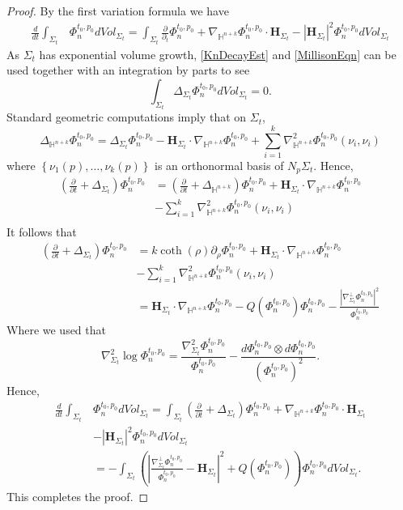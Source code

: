 \documentclass{amsart}
\theoremstyle{definition}
\theoremstyle{remark}
\numberwithin{equation}{section}
\newcommand{\set}[1]{\left\{#1\right\}}
\begin{document}
\begin{proof}
	By the first variation formula we have
	\begin{align*}
	\frac{d}{dt} \int_{\Sigma_t}& \Phi_n^{t_0, p_0} dVol_{\Sigma_t}=\int_{\Sigma_t} \frac{\partial}{\partial_t} \Phi_n^{t_0, p_0}+\nabla_{\mathbb{H}^{n+k}} \Phi_n^{t_0, p_0} \cdot \mathbf{H}_{\Sigma_t} -|\mathbf{H}_{\Sigma_t}|^2 \Phi_n^{t_0, p_0}  dVol_{\Sigma_t}
	\end{align*}
	As  $\Sigma_t$ has exponential volume growth,  \eqref{KnDecayEst} and \eqref{MillisonEqn} can be used together with an integration by parts to see
	$$
	\int_{\Sigma_t} \Delta_{{\Sigma_t}} \Phi_n^{t_0, p_0} dVol_{\Sigma_t}=0.
	$$
	Standard geometric computations imply that on $\Sigma_t$,
	$$
	\Delta_{\mathbb{H}^{n+k}} \Phi_n^{t_0, p_0} =  \Delta_{{\Sigma_t}}\Phi_n^{t_0, p_0} -\mathbf{H}_{\Sigma_t}\cdot \nabla_{\mathbb{H}^{n+k}}  \Phi_n^{t_0, p_0}+\sum_{i=1}^{k}\nabla^2_{\mathbb{H}^{n+k} }\Phi_n^{t_0, p_0} (\nu_i, \nu_i)
	$$
	where $\set{\nu_1(p), \ldots, \nu_{k}(p)}$ is an orthonormal basis of $N_p\Sigma_t$.  
	Hence,
	\begin{align*}
	\left(\frac{\partial}{\partial t} +\Delta_{\Sigma_t}\right)\Phi_n^{t_0, p_0} & =	\left(\frac{\partial}{\partial t} +\Delta_{\mathbb{H}^{n+k}}\right)\Phi_n^{t_0, p_0}+\mathbf{H}_{\Sigma_t}\cdot \nabla_{\mathbb{H}^{n+k}}  \Phi_n^{t_0, p_0}\\
	& -\sum_{i=1}^{k}\nabla^2_{\mathbb{H}^{n+k} }\Phi_n^{t_0, p_0} (\nu_i, \nu_i)\\
	\end{align*}
	It follows that
\begin{align*}
	\left(\frac{\partial}{\partial t} +\Delta_{\Sigma_t}\right)\Phi_n^{t_0, p_0} 	&= 	k \coth(\rho) \partial_\rho \Phi_{n}^{t_0,p_0}+\mathbf{H}_{\Sigma_t}\cdot \nabla_{\mathbb{H}^{n+k}}  \Phi_n^{t_0, p_0}\\
	& -\sum_{i=1}^{k}\nabla^2_{\mathbb{H}^{n+k} }\Phi_n^{t_0, p_0} (\nu_i, \nu_i)\\
	&=\mathbf{H}_{\Sigma_t}\cdot \nabla_{\mathbb{H}^{n+k}}  \Phi_n^{t_0, p_0} -Q(\Phi_n^{t_0,p_0}) \Phi_n^{t_0, p_0}	-\frac{|\nabla_{\Sigma_t}^\perp \Phi_n^{t_0,p_0}|^2}{\Phi_n^{t_0, p_0}}
	\end{align*}
	Where we used that
	$$
	 \nabla_{\Sigma_t}^2 \log \Phi_n^{t_0,p_0}=\frac{\nabla_{\Sigma_t}^2\Phi_n^{t_0,p_0}}{\Phi_n^{t_0,p_0}} -\frac{d\Phi_n^{t_0,p_0} \otimes d\Phi_n^{t_0,p_0}}{(\Phi_n^{t_0,p_0})^2}.
	$$
	Hence,
	\begin{align*}
	 \frac{d}{dt} \int_{\Sigma_t}& \Phi_n^{t_0, p_0} dVol_{\Sigma_t}=\int_{\Sigma_t}  \left(\frac{\partial}{\partial t} +\Delta_{\Sigma_t} \right)\Phi_n^{t_0, p_0}+\nabla_{\mathbb{H}^{n+k}} \Phi_n^{t_0, p_0} \cdot \mathbf{H}_{\Sigma_t} \\
	 &-|\mathbf{H}_{\Sigma_t}|^2\Phi_n^{t_0, p_0}  dVol_{\Sigma_t}\\
	 &=- \int_{\Sigma_t}\left( \left|\frac{\nabla_{\Sigma_t}^\perp \Phi_n^{t_0,p_0}}{\Phi_n^{t_0,p_0}} -\mathbf{H}_{\Sigma_t} \right|^2 +Q(\Phi_n^{t_0,p_0}) \right) \Phi_n^{t_0,p_0}dVol_{\Sigma_t}.
	\end{align*}
	This completes the proof.
\end{proof}
\end{document}

